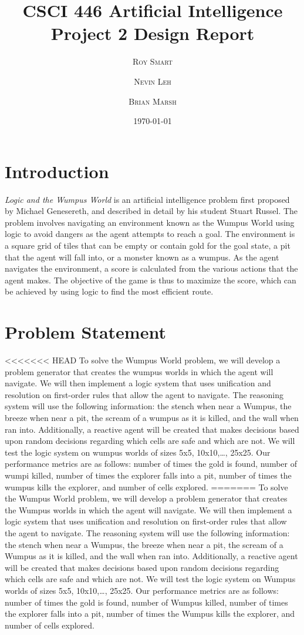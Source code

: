 \documentclass{article}
\title{\vspace{-15mm}\fontsize{24pt}{10pt}\selectfont\textbf{CSCI 446 Artificial Intelligence \\[2mm] Project 2 Design Report} } %
\date{\today}
\author{
\large
\textsc{Roy Smart} \and \textsc{Nevin Leh} \and \textsc{Brian Marsh}\\[2mm] %
}
\begin{document}
	\maketitle %
	\thispagestyle{fancy} %
	\normalsize

	\section{Introduction}
	
		\textit{Logic and the Wumpus World} is an artificial intelligence problem first proposed by Michael Genesereth, and described in detail by his student Stuart Russel\cite{ai}.  The problem involves navigating an environment known as the Wumpus World using logic to avoid dangers as the agent attempts to reach a goal.  The environment is a square grid of tiles that can be empty or contain gold for the goal state, a pit that the agent will fall into, or a monster known as a wumpus.  As the agent navigates the environment, a score is calculated from the various actions that the agent makes.  The objective of the game is thus to maximize the score, which can be achieved by using logic to find the most efficient route.
	
	\section{Problem Statement}
	
<<<<<<< HEAD
		To solve the Wumpus World problem, we will develop a problem generator that creates the wumpus worlds in which the agent will navigate.  We will then implement a logic system that uses unification and resolution on first-order rules that allow the agent to navigate.  The reasoning system will use the following information: the stench when near a Wumpus, the breeze when near a pit, the scream of a wumpus as it is killed, and the wall when ran into.  Additionally, a reactive agent will be created that makes decisions based upon random decisions regarding which cells are safe and which are not.  We will test the logic system on wumpus worlds of sizes {5x5, 10x10,…, 25x25}.  Our performance metrics are as follows: number of times the gold is found, number of wumpi killed, number of times the explorer falls into a pit, number of times the wumpus kills the explorer, and number of cells explored.
=======
		To solve the Wumpus World problem, we will develop a problem generator that creates the Wumpus worlds in which the agent will navigate.  We will then implement a logic system that uses unification and resolution on first-order rules that allow the agent to navigate.  The reasoning system will use the following information: the stench when near a Wumpus, the breeze when near a pit, the scream of a Wumpus as it is killed, and the wall when ran into.  Additionally, a reactive agent will be created that makes decisions based upon random decisions regarding which cells are safe and which are not.  We will test the logic system on Wumpus worlds of sizes {5x5, 10x10,…, 25x25}.  Our performance metrics are as follows: number of times the gold is found, number of Wumpus killed, number of times the explorer falls into a pit, number of times the Wumpus kills the explorer, and number of cells explored.
		
\end{document}
